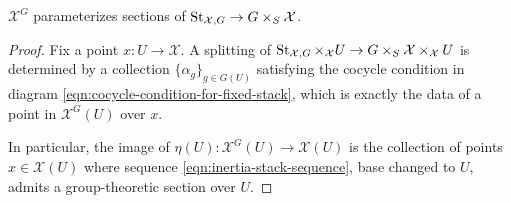 \begin{lemma}\label{rl-000B}
\cite[Lemma 4.1.2]{romagny_AlgebraicitySmoothnessFixed2022}
  \label{lem:fixed-stack-parameterizes-splittings}
  $\mathcal X^{G}$ parameterizes sections of \(\operatorname{St}_{\mathcal X,G}\to G\times_S \mathcal X\).
\end{lemma}
\begin{proof}
  Fix a point \(x:U\to \mathcal X\). A splitting of \(\operatorname{St}_{\mathcal X, G}\times_{\mathcal X}U\to G\times_S\mathcal X\times_{\mathcal X}U\) is determined by a collection \(\{\alpha_g\}_{g\in G(U)}\) satisfying the cocycle condition in diagram \eqref{eqn:cocycle-condition-for-fixed-stack}, which is exactly the data of a point in \(\mathcal X^G(U)\) over \(x\).

  In particular, the image of \(\eta(U):\mathcal X^G(U)\to \mathcal X(U)\) is the collection of points \(x\in \mathcal X(U)\) where sequence \eqref{eqn:inertia-stack-sequence}, base changed to \(U\), admits a group-theoretic section over \(U\).
\end{proof}
